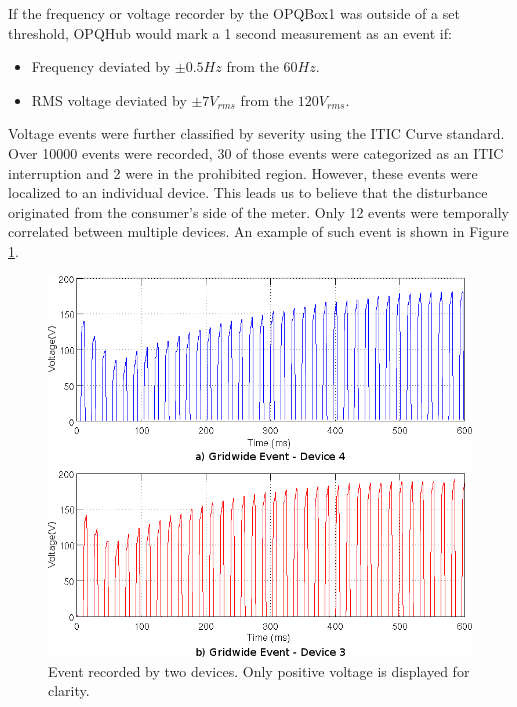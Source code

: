 If the frequency or voltage recorder by the OPQBox1 was outside of a set threshold, OPQHub would mark a 1 second measurement as an event if:
\begin{itemize}
\item Frequency deviated by $\pm 0.5Hz$ from the $60Hz$.
\item RMS voltage deviated by $\pm 7V_{rms}$ from the $120V_{rms}$.
\end{itemize}
Voltage events were further classified by severity using the ITIC Curve standard\cite{m:ITIC}. Over 10000 events were recorded, 30 of those events were categorized as an ITIC interruption and 2 were in the prohibited region. However, these events were localized to an individual device. This leads us to believe that the disturbance originated from the consumer's side of the meter. Only 12 events were temporally correlated between multiple devices. An example of such event is shown in Figure \ref{fig:gridwide}. 

\begin{figure}[htbp]
	\centering
	\includegraphics[width=1\columnwidth]{img/gridwide.png}
	\caption{Event recorded by two devices. Only positive voltage is displayed for clarity.}
	\label{fig:gridwide}
\end{figure}

